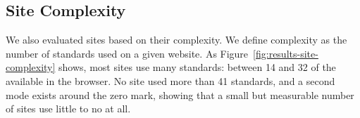 \subsection{Site Complexity}
\label{sec:results-site-complexity}



We also evaluated sites based on their complexity. We define complexity as the number of
standards used on a given website.  As
Figure~\ref{fig:results-site-complexity} shows, most sites use many standards:
between 14 and 32 of the \numstandards available in the browser. No site used
more than 41 standards, and a second mode exists around the zero mark, showing
that a small but measurable number of sites use little to no \JS at all.

